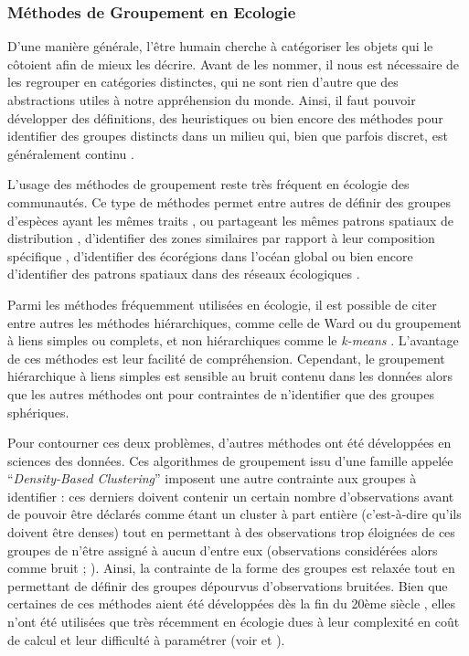 \begin{refsection}
\hypertarget{sec:introclustering}{%
\subsubsection{Méthodes de Groupement en
Ecologie}\label{sec:introclustering}}

D'une manière générale, l'être humain cherche à catégoriser les objets
qui le côtoient afin de mieux les décrire. Avant de les nommer, il nous
est nécessaire de les regrouper en catégories distinctes, qui ne sont
rien d'autre que des abstractions utiles à notre appréhension du monde.
Ainsi, il faut pouvoir développer des définitions, des heuristiques ou
bien encore des méthodes pour identifier des groupes distincts dans un
milieu qui, bien que parfois discret, est généralement continu
\autocite{Legendre_2012}.

L'usage des méthodes de groupement reste très fréquent en écologie des
communautés. Ce type de méthodes permet entre autres de définir des
groupes d'espèces ayant les mêmes traits \autocite{Mouillot_2021}, ou
partageant les mêmes patrons spatiaux de distribution
\autocite{Pang_2023}, d'identifier des zones similaires par rapport à
leur composition spécifique \autocite{Legendre_2012}, d'identifier des
écorégions dans l'océan global \autocite{Sonnewald_2020} ou bien encore
d'identifier des patrons spatiaux dans des réseaux écologiques
\autocite{Ohlsson_2020}.

Parmi les méthodes fréquemment utilisées en écologie, il est possible de
citer entre autres les méthodes hiérarchiques, comme celle de Ward ou du
groupement à liens simples ou complets, et non hiérarchiques comme le
\emph{k-means} \autocite{Legendre_2012}. L'avantage de ces méthodes est
leur facilité de compréhension. Cependant, le groupement hiérarchique à
liens simples est sensible au bruit contenu dans les données
\autocite{Legendre_2012} alors que les autres méthodes ont pour
contraintes de n'identifier que des groupes sphériques.

Pour contourner ces deux problèmes, d'autres méthodes ont été
développées en sciences des données. Ces algorithmes de groupement issu
d'une famille appelée ``\emph{Density-Based Clustering}'' imposent une
autre contrainte aux groupes à identifier : ces derniers doivent
contenir un certain nombre d'observations avant de pouvoir être déclarés
comme étant un cluster à part entière (c'est-à-dire qu'ils doivent être
denses) tout en permettant à des observations trop éloignées de ces
groupes de n'être assigné à aucun d'entre eux (observations considérées
alors comme bruit ; \textcite{Kriegel_2011}). Ainsi, la contrainte de la
forme des groupes est relaxée tout en permettant de définir des groupes
dépourvus d'observations bruitées. Bien que certaines de ces méthodes
aient été développées dès la fin du 20ème siècle \autocites[
]{Ester_1996}{Ankerst_1999}, elles n'ont été utilisées que très
récemment en écologie dues à leur complexité en coût de calcul et leur
difficulté à paramétrer (voir \textcite{Ohlsson_2020} et
\textcite{Sonnewald_2020}).


\end{refsection}
